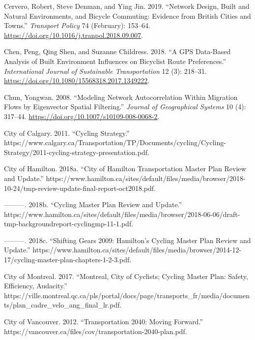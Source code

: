 \documentclass[smallextended]{svjour3}       %
\begin{document}
\leavevmode\hypertarget{ref-Cervero2019}{}%
Cervero, Robert, Steve Denman, and Ying Jin. 2019. ``Network Design,
Built and Natural Environments, and Bicycle Commuting: Evidence from
British Cities and Towns.'' \emph{Transport Policy} 74 (February):
153--64. \url{https://doi.org/10.1016/j.tranpol.2018.09.007}.

\leavevmode\hypertarget{ref-Chen2018}{}%
Chen, Peng, Qing Shen, and Suzanne Childress. 2018. ``A GPS Data-Based
Analysis of Built Environment Influences on Bicyclist Route
Preferences.'' \emph{International Journal of Sustainable
Transportation} 12 (3): 218--31.
\url{https://doi.org/10.1080/15568318.2017.1349222}.

\leavevmode\hypertarget{ref-Chun2008}{}%
Chun, Yongwan. 2008. ``Modeling Network Autocorrelation Within Migration
Flows by Eigenvector Spatial Filtering.'' \emph{Journal of Geographical
Systems} 10 (4): 317--44.
\url{https://doi.org/10.1007/s10109-008-0068-2}.

\leavevmode\hypertarget{ref-Calgary2011}{}%
City of Calgary. 2011. ``Cycling Strategy.''
https://www.calgary.ca/Transportation/TP/Documents/cycling/Cycling-Strategy/2011-cycling-strategy-presentation.pdf.

\leavevmode\hypertarget{ref-Tmp2018}{}%
City of Hamilton. 2018a. ``City of Hamilton Transportation Master Plan
Review and Update.''
https://www.hamilton.ca/sites/default/files/media/browser/2018-10-24/tmp-review-update-final-report-oct2018.pdf.

\leavevmode\hypertarget{ref-Cmp2018}{}%
---------. 2018b. ``Cycling Master Plan Review and Update.''
https://www.hamilton.ca/sites/default/files/media/browser/2018-06-06/draft-tmp-backgroundreport-cyclingmp-11-1.pdf.

\leavevmode\hypertarget{ref-Cmp2009}{}%
---------. 2018c. ``Shifting Gears 2009: Hamilton's Cycling Master Plan
Review and Update.''
https://www.hamilton.ca/sites/default/files/media/browser/2014-12-17/cycling-master-plan-chapters-1-2-3.pdf.

\leavevmode\hypertarget{ref-Montreal2017}{}%
City of Montreal. 2017. ``Montreal, City of Cyclists; Cycling Master
Plan: Safety, Efficiency, Audacity.''
https://ville.montreal.qc.ca/pls/portal/docs/page/transports\_fr/media/documents/plan\_cadre\_velo\_ang\_final\_lr.pdf.

\leavevmode\hypertarget{ref-Vancouver2012}{}%
City of Vancouver. 2012. ``Transportation 2040: Moving Forward.''
https://vancouver.ca/files/cov/transportation-2040-plan.pdf.
\end{document}
